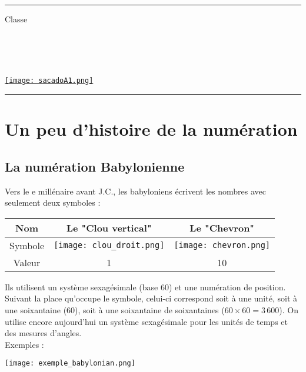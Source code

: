 \documentclass[a4paper,dvipsnames]{article}
\newcommand{\RNum}[1]{\uppercase\expandafter{\romannumeral #1\relax}}
\begin{document}

\fancyhead[C]{}
\hrule\medskip %
\begin{minipage}{0.295\textwidth} 
\raggedright
Classe \myClasse \hfill\\
\myDiscipline \hfill\\
\myParcours \hfill\\
\end{minipage}
\begin{minipage}{0.4\textwidth} 
\centering 
\scshape\huge
\textcolor{sacado_purple}{\myTitle} \\ 
\normalsize 
\end{minipage}
\begin{minipage}{0.295\textwidth} 
\raggedleft
\href{https://sacado.xyz/}{\texttt{[image: sacadoA1.png]}}
\end{minipage}
\medskip \hrule
\bigskip


\section{Un peu d'histoire de la numération}

\subsection{La numération Babylonienne}

\begin{His}
Vers le \RNum{2}e millénaire avant J.C., les babyloniens écrivent les nombres avec seulement deux symboles :\\
\begin{center}
\begin{tabular}{c|c|c}
Nom & Le "Clou vertical" & Le "Chevron" \\\hline
Symbole & \texttt{[image: clou\_droit.png]} & \texttt{[image: chevron.png]} \\\hline
Valeur & 1 & 10 \\
\end{tabular}
\end{center}

Ils utilisent un système sexagésimale (base $60$) et une numération de position. Suivant la place qu'occupe le symbole, celui-ci correspond soit à une unité, soit à une soixantaine ($60$), soit à une soixantaine de soixantaines ($60\times60=3\,600$). On utilise encore aujourd'hui un système sexagésimale pour les unités de temps et des mesures d'angles.\\

Exemples :
\begin{center}
\texttt{[image: exemple\_babylonian.png]}
\end{center}
\end{His}
\end{document}
